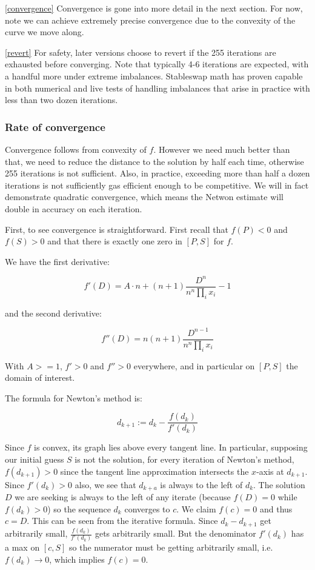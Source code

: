 \documentclass[
]{article}
\begin{document}
\ref{convergence} Convergence is gone into more detail in the next
section. For now, note we can achieve extremely precise convergence due
to the convexity of the curve we move along.

\ref{revert} For safety, later versions choose to revert if the 255
iterations are exhausted before converging. Note that typically 4-6
iterations are expected, with a handful more under extreme imbalances.
Stableswap math has proven capable in both numerical and live tests of
handling imbalances that arise in practice with less than two dozen
iterations.

\hypertarget{rate-of-convergence}{%
\subsubsection{Rate of convergence}\label{rate-of-convergence}}

Convergence follows from convexity of \(f\). However we need much better
than that, we need to reduce the distance to the solution by half each
time, otherwise 255 iterations is not sufficient. Also, in practice,
exceeding more than half a dozen iterations is not sufficiently gas
efficient enough to be competitive. We will in fact demonstrate
quadratic convergence, which means the Netwon estimate will double in
accuracy on each iteration.

First, to see convergence is straightforward. First recall that
\(f(P) < 0\) and \(f(S) > 0\) and that there is exactly one zero in
\([P, S]\) for \(f\).

We have the first derivative:

\[ f'(D) = A\cdot n + (n+1) \frac{D^n}{n^n \prod_i x_i} - 1 \]

and the second derivative:

\[ f''(D) = n (n+1) \frac{D^{n-1}}{n^n \prod_i x_i} \]

With \(A >= 1\), \(f' > 0\) and \(f'' > 0\) everywhere, and in
particular on \([P, S]\) the domain of interest.

The formula for Newton's method is:

\[ d_{k+1} := d_k - \frac{f(d_k)}{f'(d_k)} \]

Since \(f\) is convex, its graph lies above every tangent line. In
particular, supposing our initial guess \(S\) is not the solution, for
every iteration of Newton's method, \(f(d_{k+1}) > 0\) since the tangent
line approximation intersects the \(x\)-axis at \(d_{k+1}\). Since
\(f'(d_k) > 0\) also, we see that \(d_{k+a}\) is always to the left of
\(d_k\). The solution \(D\) we are seeking is always to the left of any
iterate (because \(f(D) = 0\) while \(f(d_k) > 0\)) so the sequence
\(d_k\) converges to \(c\). We claim \(f(c) = 0\) and thus \(c = D\).
This can be seen from the iterative formula. Since \(d_{k} - d_{k+1}\)
get arbitrarily small, \(\frac{f(d_k)}{f'(d_k)}\) gets arbitrarily
small. But the denominator \(f'(d_k)\) has a max on \([c, S]\) so the
numerator must be getting arbitrarily small,
i.e.~\(f(d_k) \rightarrow 0\), which implies \(f(c) = 0\).
\end{document}

